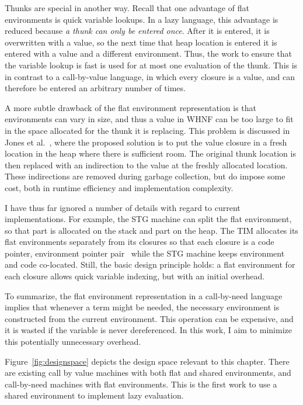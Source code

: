 Thunks are special in another way.  Recall that one advantage of flat
environments is quick variable lookups. In a lazy language, this advantage is
reduced because \emph{a thunk can only be entered once}. After it is entered, it
is overwritten with a value, so the next time that heap location is entered it
is entered with a value and a different environment. Thus, the work to ensure
that the variable lookup is fast is used for at most one evaluation of the
thunk. This is in contrast to a call-by-value language, in which every closure
is a value, and can therefore be entered an arbitrary number of times. 

A more subtle drawback of the flat environment representation is that
environments can vary in size, and thus a value in WHNF can be too large to fit
in the space allocated for the thunk it is replacing. This problem is discussed
in Jones et al.~\cite{jonesstg}, where the proposed solution is to put the value
closure in a fresh location in the heap where there is sufficient room. The
original thunk location is then replaced with an indirection to the value at the
freshly allocated location. These indirections are removed during garbage
collection, but do impose some cost, both in runtime efficiency and
implementation complexity.

I have thus far ignored a number of details with regard to current
implementations. For example, the STG machine can split the flat environment, so
that part is allocated on the stack and part on the heap.  The TIM allocates its
flat environments separately from its closures so that each closure is a code
pointer, environment pointer pair~\cite{TIM} while the STG machine keeps
environment and code co-located. Still, the basic design principle holds: a flat
environment for each closure allows quick variable indexing, but with an initial
overhead.

To summarize, the flat environment representation in a call-by-need language
implies that whenever a term might be needed, the necessary environment is
constructed from the current environment.  This operation can be expensive, and
it is wasted if the variable is never dereferenced. In this work, I aim to
minimize this potentially unnecessary overhead.

Figure~\ref{fig:designspace} depicts the design space relevant to this chapter.
There are existing call by value machines with both flat and shared
environments, and call-by-need machines with flat environments. This is the
first work to use a shared environment to implement lazy evaluation. 

